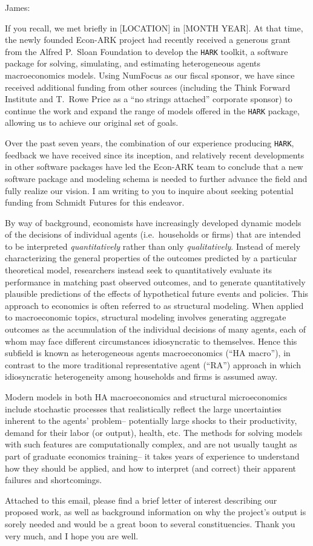 \documentclass[12pt,pdftex,letterpaper]{article}
\begin{document}
	\pagestyle{empty}
	
James:

If you recall, we met briefly in [LOCATION] in [MONTH YEAR]. At that time, the newly founded Econ-ARK project had recently received a generous grant from the Alfred P.\ Sloan Foundation to develop the \texttt{HARK} toolkit, a software package for solving, simulating, and estimating heterogeneous agents macroeconomics models. Using NumFocus as our fiscal sponsor, we have since received additional funding from other sources (including the Think Forward Institute and T.\ Rowe Price as a ``no strings attached'' corporate sponsor) to continue the work and expand the range of models offered in the \texttt{HARK} package, allowing us to achieve our original set of goals.

Over the past seven years, the combination of our experience producing \texttt{HARK}, feedback we have received since its inception, and relatively recent developments in other software packages have led the Econ-ARK team to conclude that a new software package and modeling schema is needed to further advance the field and fully realize our vision. I am writing to you to inquire about seeking potential funding from Schmidt Futures for this endeavor.

By way of background, economists have increasingly developed dynamic models of the decisions of individual agents (i.e.\ households or firms) that are intended to be interpreted \textit{quantitatively} rather than only \textit{qualitatively}. Instead of merely characterizing the general properties of the outcomes predicted by a particular theoretical model, researchers instead seek to quantitatively evaluate its performance in matching past observed outcomes, and to generate quantitatively plausible predictions of the effects of hypothetical future events and policies. This approach to economics is often referred to as structural modeling. When applied to macroeconomic topics, structural modeling involves generating aggregate outcomes as the accumulation of the individual decisions of many agents, each of whom may face different circumstances idiosyncratic to themselves. Hence this subfield is known as heterogeneous agents macroeconomics (``HA macro''), in contrast to the more traditional representative agent (``RA'') approach in which idiosyncratic heterogeneity among households and firms is assumed away.

Modern models in both HA macroeconomics and structural microeconomics include stochastic processes that realistically reflect the large uncertainties inherent to the agents' problem-- potentially large shocks to their productivity, demand for their labor (or output), health, etc. The methods for solving models with such features are computationally complex, and are not usually taught as part of graduate economics training-- it takes years of experience to understand how they should be applied, and how to interpret (and correct) their apparent failures and shortcomings.

Attached to this email, please find a brief letter of interest describing our proposed work, as well as background information on why the project's output is sorely needed and would be a great boon to several constituencies. Thank you very much, and I hope you are well.
\end{document}
